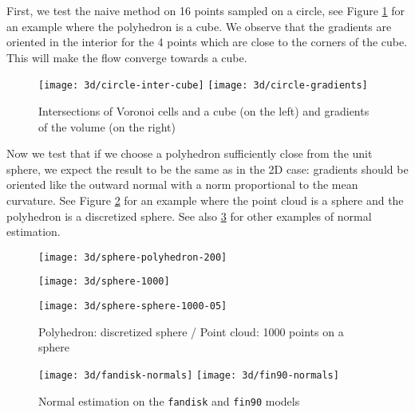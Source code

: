 First, we test the naive method on 16 points sampled on a circle, see Figure
\ref{fig:3d-circle} for an example where the polyhedron is a cube. We observe
that the gradients are oriented in the interior for the 4 points which are close
to the corners of the cube. This will make the flow converge towards a cube.

\begin{figure}[h]
    \centering
    \texttt{[image: 3d/circle-inter-cube]}
    \texttt{[image: 3d/circle-gradients]}
    \caption{Intersections of Voronoi cells and a cube (on the left) and
        gradients of the volume (on the right)}
    \label{fig:3d-circle}
\end{figure}

Now we test that if we choose a polyhedron sufficiently close from the unit
sphere, we expect the result to be the same as in the 2D case: gradients should
be oriented like the outward normal with a norm proportional to the mean
curvature. See Figure \ref{fig:3d-mean-curvature-sphere-sphere} for an example
where the point cloud is a sphere and the polyhedron is a discretized sphere.
See also \ref{fig:3d-mean-curvature-models} for other examples of normal
estimation.

\begin{figure}[h]
    \centering
    \begin{minipage}{0.32\linewidth}
        \centering
        \texttt{[image: 3d/sphere-polyhedron-200]}
    \end{minipage}
    \begin{minipage}{0.32\linewidth}
        \centering
        \texttt{[image: 3d/sphere-1000]}
    \end{minipage}
    \begin{minipage}{0.32\linewidth}
        \centering
        \texttt{[image: 3d/sphere-sphere-1000-05]}
    \end{minipage}
    \caption{Polyhedron: discretized sphere / Point cloud: 1000 points on a sphere}
    \label{fig:3d-mean-curvature-sphere-sphere}
\end{figure}

\begin{figure}[h]
    \centering
    \texttt{[image: 3d/fandisk-normals]}
    \texttt{[image: 3d/fin90-normals]}
    \caption{Normal estimation on the \texttt{fandisk} and \texttt{fin90} models}
    \label{fig:3d-mean-curvature-models}
\end{figure}

